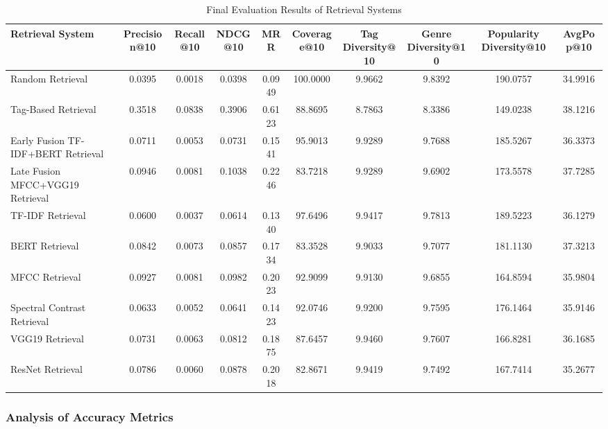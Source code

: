 \documentclass[sigconf]{acmart}
\begin{document}
\begin{table}[ht]
    \centering
    \caption{Final Evaluation Results of Retrieval Systems}
    \label{tab:final_evaluation_results}
    \begin{tabular}{lccccccccc}
        \toprule
        \textbf{Retrieval System} & \textbf{Precision@10} & \textbf{Recall@10} & \textbf{NDCG@10} & \textbf{MRR} & \textbf{Coverage@10} & \textbf{Tag Diversity@10} & \textbf{Genre Diversity@10} & \textbf{Popularity Diversity@10} & \textbf{AvgPop@10} \\
        \midrule
        Random Retrieval                        & 0.0395 & 0.0018 & 0.0398 & 0.0949 & 100.0000 & 9.9662 & 9.8392 & 190.0757 & 34.9916 \\
        Tag-Based Retrieval                     & 0.3518 & 0.0838 & 0.3906 & 0.6123 & 88.8695 & 8.7863 & 8.3386 & 149.0238 & 38.1216 \\
        Early Fusion TF-IDF+BERT Retrieval      & 0.0711 & 0.0053 & 0.0731 & 0.1541 & 95.9013 & 9.9289 & 9.7688 & 185.5267 & 36.3373 \\
        Late Fusion MFCC+VGG19 Retrieval        & 0.0946 & 0.0081 & 0.1038 & 0.2246 & 83.7218 & 9.9289 & 9.6902 & 173.5578 & 37.7285 \\
        TF-IDF Retrieval                        & 0.0600 & 0.0037 & 0.0614 & 0.1340 & 97.6496 & 9.9417 & 9.7813 & 189.5223 & 36.1279 \\
        BERT Retrieval                          & 0.0842 & 0.0073 & 0.0857 & 0.1734 & 83.3528 & 9.9033 & 9.7077 & 181.1130 & 37.3213 \\
        MFCC Retrieval                          & 0.0927 & 0.0081 & 0.0982 & 0.2023 & 92.9099 & 9.9130 & 9.6855 & 164.8594 & 35.9804 \\
        Spectral Contrast Retrieval             & 0.0633 & 0.0052 & 0.0641 & 0.1423 & 92.0746 & 9.9200 & 9.7595 & 176.1464 & 35.9146 \\
        VGG19 Retrieval                         & 0.0731 & 0.0063 & 0.0812 & 0.1875 & 87.6457 & 9.9460 & 9.7607 & 166.8281 & 36.1685 \\
        ResNet Retrieval                        & 0.0786 & 0.0060 & 0.0878 & 0.2018 & 82.8671 & 9.9419 & 9.7492 & 167.7414 & 35.2677 \\
        \bottomrule
    \end{tabular}
\end{table}

\subsubsection{Analysis of Accuracy Metrics}
\end{document}
